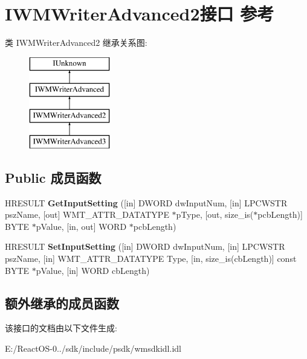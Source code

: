 \hypertarget{interface_i_w_m_writer_advanced2}{}\section{I\+W\+M\+Writer\+Advanced2接口 参考}
\label{interface_i_w_m_writer_advanced2}
类 I\+W\+M\+Writer\+Advanced2 继承关系图\+:\begin{figure}[H]
\begin{center}
\leavevmode
\includegraphics[height=4.000000cm]{interface_i_w_m_writer_advanced2}
\end{center}
\end{figure}
\subsection*{Public 成员函数}
\begin{DoxyCompactItemize}
\item 
\mbox{\label{interface_i_w_m_writer_advanced2_a86b1958a153506db8789ab505d293504}} 
H\+R\+E\+S\+U\+LT {\bfseries Get\+Input\+Setting} (\mbox{[}in\mbox{]} D\+W\+O\+RD dw\+Input\+Num, \mbox{[}in\mbox{]} L\+P\+C\+W\+S\+TR psz\+Name, \mbox{[}out\mbox{]} W\+M\+T\+\_\+\+A\+T\+T\+R\+\_\+\+D\+A\+T\+A\+T\+Y\+PE $\ast$p\+Type, \mbox{[}out, size\+\_\+is($\ast$pcb\+Length)\mbox{]} B\+Y\+TE $\ast$p\+Value, \mbox{[}in, out\mbox{]} W\+O\+RD $\ast$pcb\+Length)
\item 
\mbox{\label{interface_i_w_m_writer_advanced2_ae4ae62cf4408e28591c3eee704f75d15}} 
H\+R\+E\+S\+U\+LT {\bfseries Set\+Input\+Setting} (\mbox{[}in\mbox{]} D\+W\+O\+RD dw\+Input\+Num, \mbox{[}in\mbox{]} L\+P\+C\+W\+S\+TR psz\+Name, \mbox{[}in\mbox{]} W\+M\+T\+\_\+\+A\+T\+T\+R\+\_\+\+D\+A\+T\+A\+T\+Y\+PE Type, \mbox{[}in, size\+\_\+is(cb\+Length)\mbox{]} const B\+Y\+TE $\ast$p\+Value, \mbox{[}in\mbox{]} W\+O\+RD cb\+Length)
\end{DoxyCompactItemize}
\subsection*{额外继承的成员函数}


该接口的文档由以下文件生成\+:\begin{DoxyCompactItemize}
\item 
E\+:/\+React\+O\+S-\/0../sdk/include/psdk/wmsdkidl.\+idl\end{DoxyCompactItemize}
